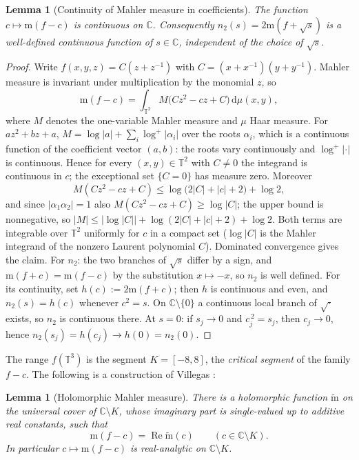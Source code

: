 \documentclass[11pt]{article}
\newtheorem{lemma}[theorem]{Lemma}
\theoremstyle{definition}
\theoremstyle{remark}
\newcommand{\Cc}{\mathbb{C}}
\newcommand{\Tt}{\mathbb{T}}
\newcommand{\id}{\mathrm{d}}
\newcommand{\ReT}{\operatorname{Re}}
\newcommand{\m}{\mathrm{m}}
\newcommand{\mt}{\widetilde{\m}}
\begin{document}
\begin{lemma}[Continuity of Mahler measure in coefficients]\label{lem:continuity}
The function $c\mapsto\m(f-c)$ is continuous on $\Cc$. Consequently
$n_2(s)=2\m(f+\sqrt{s})$ is a well-defined continuous function of
$s\in\Cc$, independent of the choice of $\sqrt{s}$.
\end{lemma}
\begin{proof}
Write $f(x,y,z)=C(z+z^{-1})$ with $C=(x+x^{-1})(y+y^{-1})$. Mahler measure
is invariant under multiplication by the monomial $z$, so
\[
  \m(f-c)=\int_{\Tt^2} M\bigl(Cz^2-cz+C\bigr)\,\id\mu(x,y),
\]
where $M$ denotes the one-variable Mahler measure and $\mu$ Haar measure.
For $az^2+bz+a$, $M=\log|a|+\sum_{i}\log^+|\alpha_i|$ over the roots
$\alpha_i$, which is a continuous function of the coefficient vector
$(a,b)$: the roots vary continuously and $\log^+|\cdot|$ is continuous.
Hence for every $(x,y)\in\Tt^2$ with $C\neq0$ the integrand is continuous
in $c$; the exceptional set $\{C=0\}$ has measure zero. Moreover
\[
  M(Cz^2-cz+C)\le \log\bigl(2|C|+|c|+2\bigr)+\log 2,
\]
and since $|\alpha_1\alpha_2|=1$ also $M(Cz^2-cz+C)\ge\log|C|$; the
upper bound is nonnegative, so
$|M|\le|\log|C||+\log(2|C|+|c|+2)+\log2$. Both terms are integrable
over $\Tt^2$ uniformly for $c$ in a compact set ($\log|C|$ is the
Mahler integrand of the nonzero Laurent polynomial $C$). Dominated
convergence gives the claim. For $n_2$: the two branches of
$\sqrt{s}$ differ by a sign, and $\m(f+c)=\m(f-c)$ by the substitution
$x\mapsto -x$, so $n_2$ is well defined. For its continuity, set
$h(c):=2\m(f+c)$; then $h$ is continuous and even, and
$n_2(s)=h(c)$ whenever $c^2=s$. On $\Cc\setminus\{0\}$ a continuous
local branch of $\sqrt{\cdot}$ exists, so $n_2$ is continuous there.
At $s=0$: if $s_j\to0$ and $c_j^{\,2}=s_j$, then $c_j\to0$, hence
$n_2(s_j)=h(c_j)\to h(0)=n_2(0)$.
\end{proof}

The range $f(\Tt^3)$ is the segment $K=[-8,8]$, the \emph{critical
segment} of the family $f-c$. The following is a construction of
Villegas \cite{RV}:

\begin{lemma}[Holomorphic Mahler measure]\label{lem:FV}
There is a holomorphic function $\mt$ on the universal cover of
$\Cc\setminus K$, whose imaginary part is single-valued up to additive real
constants, such that
\[
  \m(f-c)=\ReT\mt(c)\qquad(c\in\Cc\setminus K).
\]
In particular $c\mapsto\m(f-c)$ is real-analytic on $\Cc\setminus K$.
\end{lemma}
\end{document}
